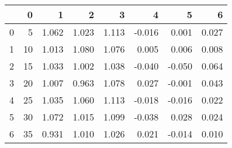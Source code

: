 \begin{tabular}{lrrrrrrr}
\toprule
{} &   0 &      1 &      2 &      3 &      4 &      5 &      6 \\
\midrule
0 &   5 &  1.062 &  1.023 &  1.113 & -0.016 &  0.001 &  0.027 \\
1 &  10 &  1.013 &  1.080 &  1.076 &  0.005 &  0.006 &  0.008 \\
2 &  15 &  1.033 &  1.002 &  1.038 & -0.040 & -0.050 &  0.064 \\
3 &  20 &  1.007 &  0.963 &  1.078 &  0.027 & -0.001 &  0.043 \\
4 &  25 &  1.035 &  1.060 &  1.113 & -0.018 & -0.016 &  0.022 \\
5 &  30 &  1.072 &  1.015 &  1.099 & -0.038 &  0.028 &  0.024 \\
6 &  35 &  0.931 &  1.010 &  1.026 &  0.021 & -0.014 &  0.010 \\
\bottomrule
\end{tabular}

